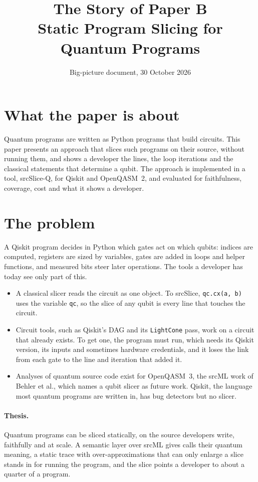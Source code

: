 \documentclass[10pt]{article}
\title{The Story of Paper B\\[2pt]\large Static Program Slicing for Quantum Programs}
\date{Big-picture document, 30 October 2026}
\newcommand{\tool}{srcSlice-Q}
\begin{document}
\maketitle

\section*{What the paper is about}
Quantum programs are written as Python programs that build circuits. This paper presents an approach that slices
such programs on their source, without running them, and shows a developer the lines, the loop iterations and the
classical statements that determine a qubit. The approach is implemented in a tool, \tool{}, for Qiskit and
OpenQASM~2, and evaluated for faithfulness, coverage, cost and what it shows a developer.

\section*{The problem}
A Qiskit program decides in Python which gates act on which qubits: indices are computed, registers are sized by
variables, gates are added in loops and helper functions, and measured bits steer later operations. The tools a
developer has today see only part of this.
\begin{itemize}
\item A classical slicer reads the circuit as one object. To srcSlice, \texttt{qc.cx(a, b)} uses the variable
\texttt{qc}, so the slice of any qubit is every line that touches the circuit.
\item Circuit tools, such as Qiskit's DAG and its \texttt{LightCone} pass, work on a circuit that already exists. To get
one, the program must run, which needs its Qiskit version, its inputs and sometimes hardware credentials, and it
loses the link from each gate to the line and iteration that added it.
\item Analyses of quantum source code exist for OpenQASM~3, the srcML work of Behler et al., which names a qubit
slicer as future work. Qiskit, the language most quantum programs are written in, has bug detectors but no slicer.
\end{itemize}

\paragraph{Thesis.} Quantum programs can be sliced statically, on the source developers write, faithfully and at
scale. A semantic layer over srcML gives calls their quantum meaning, a static trace with over-approximations that
can only enlarge a slice stands in for running the program, and the slice points a developer to about a quarter of
a program.
\end{document}

